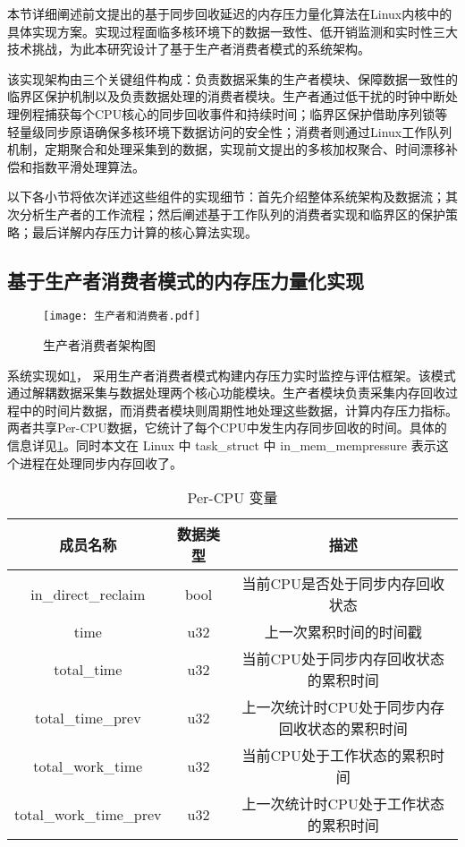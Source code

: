 本节详细阐述前文提出的基于同步回收延迟的内存压力量化算法在Linux内核中的具体实现方案。实现过程面临多核环境下的数据一致性、低开销监测和实时性三大技术挑战，为此本研究设计了基于生产者消费者模式的系统架构。

该实现架构由三个关键组件构成：负责数据采集的生产者模块、保障数据一致性的临界区保护机制以及负责数据处理的消费者模块。生产者通过低干扰的时钟中断处理例程捕获每个CPU核心的同步回收事件和持续时间；临界区保护借助序列锁等轻量级同步原语确保多核环境下数据访问的安全性；消费者则通过Linux工作队列机制，定期聚合和处理采集到的数据，实现前文提出的多核加权聚合、时间漂移补偿和指数平滑处理算法。

以下各小节将依次详述这些组件的实现细节：首先介绍整体系统架构及数据流；其次分析生产者的工作流程；然后阐述基于工作队列的消费者实现和临界区的保护策略；最后详解内存压力计算的核心算法实现。

\subsection{基于生产者消费者模式的内存压力量化实现}

\begin{figure}[H]
    \centering
    \texttt{[image: 生产者和消费者.pdf]}
    \caption{生产者消费者架构图}
    \label{fig:producer-consumer}
\end{figure}

系统实现如\ref{fig:producer-consumer}， 采用生产者消费者模式构建内存压力实时监控与评估框架。该模式通过解耦数据采集与数据处理两个核心功能模块。生产者模块负责采集内存回收过程中的时间片数据，而消费者模块则周期性地处理这些数据，计算内存压力指标。两者共享Per-CPU数据，它统计了每个CPU中发生内存同步回收的时间。具体的信息详见\ref{tab:sensor_data}。同时本文在 Linux 中 task\_struct 中 in\_mem\_mempressure 表示这个进程在处理同步内存回收了。

\begin{table}[htbp]
    \centering
    \caption{Per-CPU 变量}
    \label{tab:sensor_data}
    \begin{tabular}{ccc}
        \toprule
        成员名称& 数据类型     & 描述                                        \\ \midrule
        in\_direct\_reclaim & bool & 当前CPU是否处于同步内存回收状态\\
        time & u32 & 上一次累积时间的时间戳\\
        total\_time &u32&当前CPU处于同步内存回收状态的累积时间\\
        total\_time\_prev&u32&上一次统计时CPU处于同步内存回收状态的累积时间\\
        total\_work\_time&u32&当前CPU处于工作状态的累积时间\\
        total\_work\_time\_prev&u32&上一次统计时CPU处于工作状态的累积时间\\
        \bottomrule
    \end{tabular}
  \end{table}

